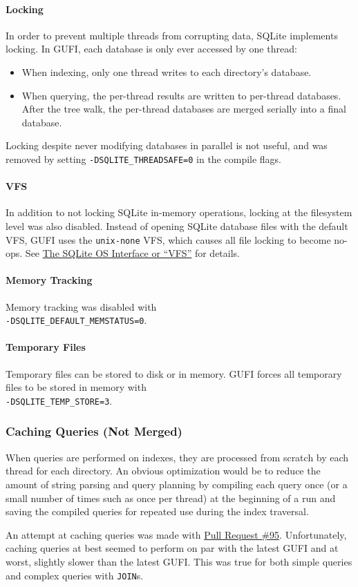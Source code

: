 \paragraph{Locking}
In order to prevent multiple threads from corrupting data, SQLite
implements locking. In GUFI, each database is only ever accessed by
one thread:

\begin{itemize}
\item When indexing, only one thread writes to each directory's
  database.
\item When querying, the per-thread results are written to per-thread
  databases. After the tree walk, the per-thread databases are merged
  serially into a final database.
\end{itemize}

Locking despite never modifying databases in parallel is not useful,
and was removed by setting \texttt{-DSQLITE\_THREADSAFE=0} in the
compile flags.

\paragraph{VFS}
In addition to not locking SQLite in-memory operations, locking at the
filesystem level was also disabled. Instead of opening SQLite database
files with the default VFS, GUFI uses the \texttt{unix-none} VFS,
which causes all file locking to become no-ops. See
\href{https://www.sqlite.org/vfs.html}{The SQLite OS Interface or
  ``VFS''} for details.

\paragraph{Memory Tracking}
Memory tracking was disabled with \\
\noindent \texttt{-DSQLITE\_DEFAULT\_MEMSTATUS=0}.

\paragraph{Temporary Files}
Temporary files can be stored to disk or in memory. GUFI forces all
temporary files to be stored in memory with \\
\texttt{-DSQLITE\_TEMP\_STORE=3}.

\subsubsection{Caching Queries (Not Merged)}
When queries are performed on indexes, they are processed from
scratch by each thread for each directory. An obvious optimization
would be to reduce the amount of string parsing and query planning by
compiling each query once (or a small number of times such as once per
thread) at the beginning of a run and saving the compiled queries for
repeated use during the index traversal.

An attempt at caching queries was made with
\href{https://github.com/mar-file-system/GUFI/pull/95}{Pull Request
  \#95}. Unfortunately, caching queries at best seemed to perform on
par with the latest GUFI and at worst, slightly slower than the latest
GUFI. This was true for both simple queries and complex queries with
\texttt{JOIN}s.
